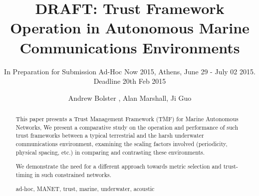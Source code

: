 \documentclass[runningheads,a4paper]{llncs}
\newcommand{\keywords}[1]{\par\addvspace\baselineskip
\noindent\keywordname\enspace\ignorespaces#1}
\begin{document}
\mainmatter  %

\title{DRAFT: Trust Framework Operation in Autonomous Marine Communications Environments}
\subtitle{In Preparation for Submission Ad-Hoc Now 2015, Athens, June 29 - July 02 2015. Deadline 20th Feb 2015}


%
%
\author{Andrew Bolster%
, Alan Marshall, Ji Guo}
%


\maketitle   

\begin{abstract}
  This paper presents a Trust Management Framework (TMF) for Marine Autonomous Networks, 
  We present a comparative study on the operation and performance of such trust frameworks between a typical terrestrial and the harsh underwater communications environment, examining the scaling factors involved (periodicity, physical spacing, etc.) in comparing and contrasting these environments.

  We demonstrate the need for a different approach towards metric selection and trust-timing in such constrained networks.
  \keywords{ad-hoc, MANET, trust, marine, underwater, acoustic}
\end{abstract}
\end{document}
